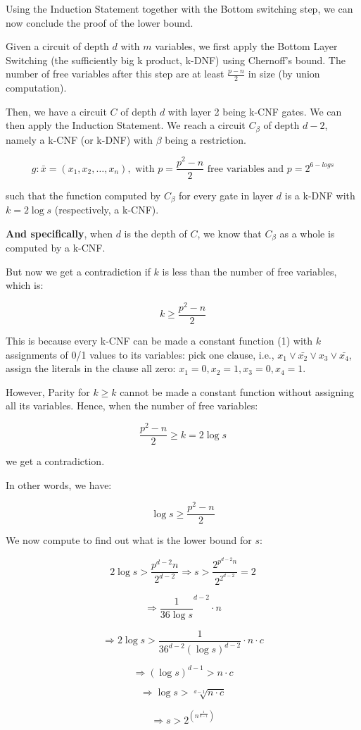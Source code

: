 Using the Induction Statement together with the Bottom switching step,
we can now conclude the proof of the lower bound.

Given a circuit of depth $d$ with $m$ variables,
we first apply the Bottom Layer Switching (the sufficiently big k product, k-DNF)
using Chernoff's bound. The number of free variables after this step
are at least $\frac{p - n}{2}$ in size (by union computation).

Then, we have a circuit $C$ of depth $d$ with layer 2 being k-CNF gates.
We can then apply the Induction Statement. We reach a circuit $C_{\beta}$ of depth $d-2$,
namely a k-CNF (or k-DNF) with $\beta$ being a restriction.

$$ g: \bar{x} = (x_1, x_2, \dots, x_n), \text{ with } p = \frac{p^2 - n}{2} \text{ free variables and } p = 2^{6-logs} $$

such that the function computed by $C_{\beta}$ for every gate in layer $d$
is a k-DNF with $k = 2 \log s$ (respectively, a k-CNF).

\textbf{And specifically}, when $d$ is the depth of $C$, we know that $C_{\beta}$ as a whole is computed by a k-CNF.

But now we get a contradiction if $k$ is less than the number of free variables, which is:

$$ k \geq \frac{p^2 - n}{2} $$

This is because every k-CNF can be made a constant function (1) with $k$ assignments of 0/1 values to its variables:
pick one clause, i.e., $x_1 \vee \bar{x_2} \vee x_3 \vee \bar{x_4}$,
assign the literals in the clause all zero: $x_1 = 0, x_2 = 1, x_3 = 0, x_4 = 1$.

However, Parity for $k \geq k$ cannot be made a constant function without assigning all its variables.
Hence, when the number of free variables:

$$ \frac{p^2 - n}{2} \geq k = 2 \log s $$

we get a contradiction.

In other words, we have:

$$ \log s \geq \frac{p^2 - n}{2} $$

We now compute to find out what is the lower bound for $s$:

$$ 2 \log s > \frac{p^{d-2} n}{2^{d-2}} \Rightarrow s > \frac{2^{p^{d-2} n}}{2^{2^{d-2}}} = 2 $$

$$ \Rightarrow \frac{1}{36 \log s}^{d-2} \cdot n $$

$$ \Rightarrow 2 \log s > \frac{1}{36^{d-2} (\log s)^{d-2}} \cdot n \cdot c $$

$$ \Rightarrow (\log s)^{d-1} > n \cdot c $$

$$ \Rightarrow \log s > \sqrt[d-1]{n \cdot c} $$

$$ \Rightarrow s > 2^{(n^{\frac{1}{d-1}})} $$




